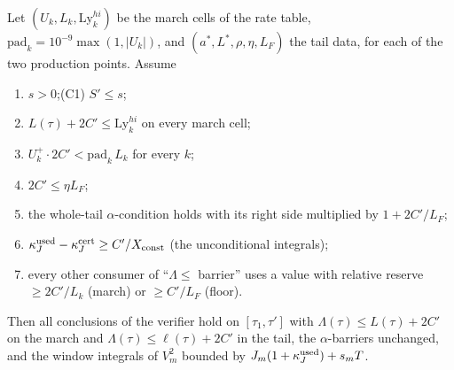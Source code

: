 \documentclass[11pt]{article}
\newcommand{\fn}[1]{\texttt{\detokenize{#1}}}
\begin{document}
\begin{proposition}\label{F:prop:abs}
Let $(U_k,L_k,\mathrm{Ly}^{hi}_k)$ be the march cells of the rate table, $\mathrm{pad}_k=10^{-9}\max(1,|U_k|)$, and $(a^*,L^*,\rho,\eta,L_F)$ the tail data, for each of the two production points. Assume
\begin{enumerate}[label=(C\arabic*),leftmargin=3em,start=0]
\item $s>0$;\quad \textup{(C1)} $S'\le s$;
\setcounter{enumi}{1}
\item $L(\tau)+2C'\le\mathrm{Ly}^{hi}_k$ on every march cell;
\item $U_k^+\cdot2C'<\mathrm{pad}_k\,L_k$ for every $k$;
\item $2C'\le\eta L_F$;
\item the whole-tail $\alpha$-condition holds with its right side multiplied by $1+2C'/L_F$;
\item $\kappa_J^{\rm used}-\kappa_J^{\rm cert}\ge C'/X_{\rm const}$ (the unconditional integrals);
\item every other consumer of ``$\Lambda\le$ barrier'' uses a value with relative reserve $\ge2C'/L_k$ (march) or $\ge C'/L_F$ (floor).
\end{enumerate}
Then all conclusions of the verifier \fn{fin13v4b} hold on $[\tau_1,\tau']$ with $\Lambda(\tau)\le L(\tau)+2C'$ on the march and $\Lambda(\tau)\le\ell(\tau)+2C'$ in the tail, the $\alpha$-barriers unchanged, and the window integrals of $V_m^2$ bounded by $J_m(1+\kappa_J^{\rm used})+s_mT$.
\end{proposition}
\end{document}
